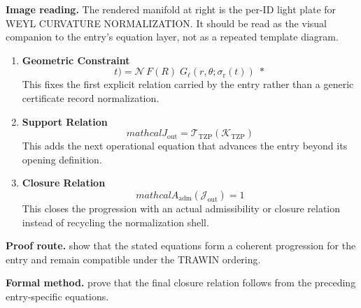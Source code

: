 \begin{samepage}
\noindent\begin{minipage}[t]{0.45\linewidth}
\vspace{0pt}
\raggedright
\scriptsize\textbf{Image reading.} The rendered manifold at right is the per-ID light plate for WEYL CURVATURE NORMALIZATION. It should be read as the visual companion to the entry's equation layer, not as a repeated template diagram.\par
\end{minipage}\hfill
\begin{minipage}[t]{0.53\linewidth}
\vspace*{-0.10in}
\raggedright
{}
\end{minipage}
\end{samepage}

\clearpage


\begin{enumerate}[leftmargin=1.6em,itemsep=9pt,topsep=6pt]
\item \textbf{Geometric Constraint}
\[
t)=\mathcal N\,F(R)\;G_\ell(r,\theta;\sigma_{\mathrm{r}}(t)) \;\ast
\]
This fixes the first explicit relation carried by the entry rather than a generic certificate record normalization.

\item \textbf{Support Relation}
\[
mathcal{J}_{\mathrm{out}} = \mathcal{T}_{\mathrm{TZP}}\!\left(\mathcal{K}_{\mathrm{TZP}}\right)
\]
This adds the next operational equation that advances the entry beyond its opening definition.

\item \textbf{Closure Relation}
\[
mathcal{A}_{\mathrm{adm}}\!\left(\mathcal{J}_{\mathrm{out}}\right)=1
\]
This closes the progression with an actual admissibility or closure relation instead of recycling the normalization shell.
\end{enumerate}

\textbf{Proof route.} show that the stated equations form a coherent progression for the entry and remain compatible under the TRAWIN ordering.

\textbf{Formal method.} prove that the final closure relation follows from the preceding entry-specific equations.

\medskip
{}

